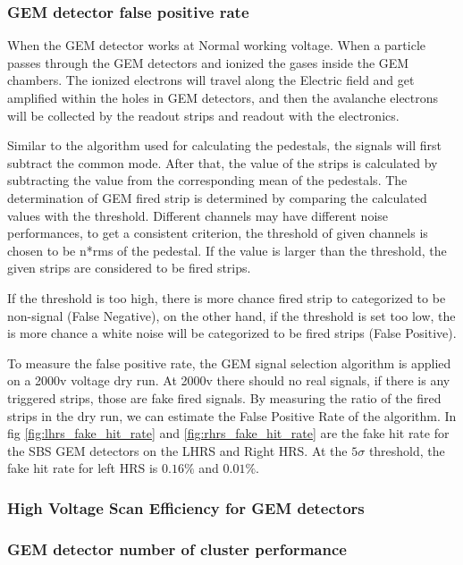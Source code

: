 \subsubsection{GEM detector false positive rate}

When the GEM detector works at Normal working voltage. When a particle passes through  the GEM detectors and ionized the gases inside the GEM chambers. The ionized electrons will travel along the Electric field and get amplified within the holes in GEM detectors, and then the avalanche electrons will be collected by the readout strips and readout with the electronics. 

Similar to the algorithm used for calculating the pedestals, the signals will first subtract the common mode. After that, the value of the strips is calculated by subtracting the value from the corresponding mean of the pedestals. The determination of GEM fired strip is determined by comparing the calculated values with the threshold. Different channels may have different noise performances, to get a consistent criterion, the threshold of given channels is chosen to be n*rms of the pedestal. If the value is larger than the threshold, the given strips are considered to be fired strips. 

If the threshold is too high, there is more chance fired strip to categorized to be non-signal (False Negative), on the other hand, if the threshold is set too low, the is more chance a white noise will be categorized to be fired strips (False Positive). 

To measure the false positive rate, the GEM signal selection algorithm is applied on a 2000v voltage dry run. At 2000v there should no real signals, if there is any triggered strips, those are fake fired signals. By measuring the ratio of the fired strips in the dry run, we can estimate the False Positive Rate of the algorithm. In fig \ref{fig:lhrs_fake_hit_rate} and \ref{fig:rhrs_fake_hit_rate} are the fake hit rate for the SBS GEM detectors on the LHRS and Right HRS. At the $5\sigma$ threshold, the fake hit rate for left HRS is $0.16\%$ and $0.01\%$.

\subsubsection{High Voltage Scan Efficiency for GEM detectors}
\subsubsection{GEM detector number of cluster performance}
